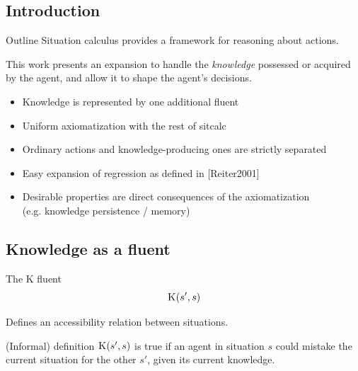 

\subsection{Introduction}

\begin{frame}{Outline}
    Situation calculus provides a framework for reasoning about actions.

    This work presents an expansion to handle the \textit{knowledge} possessed or acquired by the agent,
    and allow it to shape the agent's decisions.
    \begin{itemize}%
        \item Knowledge is represented by one additional fluent
        \item Uniform axiomatization with the rest of sitcalc
        \item Ordinary actions and knowledge-producing ones are strictly separated
        \item Easy expansion of regression as defined in [Reiter2001]
        \item Desirable properties are direct consequences of the axiomatization \\
                (e.g. knowledge persistence / memory)
    \end{itemize}
\end{frame}



\subsection{Knowledge as a fluent}

\begin{frame}[fragile]{The K fluent}
    \huge
    \[ \textsc{K}(s', s) \]
    \normalsize

    Defines an accessibility relation between situations.

    \begin{block}{(Informal) definition}
        \( \textsc{K}(s',s) \) is true if an agent in situation \(s\)
        could mistake the current situation for the other \(s'\),
        given its current knowledge.
    \end{block}
\end{frame}

